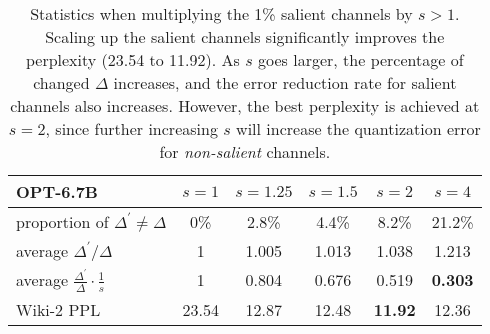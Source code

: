 \begin{table}
    \setlength{\tabcolsep}{2pt}
    \small
    \centering
    \begin{tabular}{lccccc}
        \toprule
     \textbf{OPT-6.7B}   & $s=1$ & $s=1.25$ & $s=1.5$ & $s=2$ & $s=4$ \\ \midrule
    proportion of $\Delta^{'} \neq \Delta$ & 0\% & 2.8\% & 4.4\% & 8.2\% & 21.2\% \\
    average $\Delta^{'}/ \Delta$ & 1 & 1.005 & 1.013 & 1.038 & 1.213 \\
    average $\frac{\Delta^{'}}{\Delta} \cdot \frac{1}{s}$ & 1 & 0.804  & 0.676 & 0.519 & \textbf{0.303} \\ \midrule 
    Wiki-2 PPL & 23.54 & 12.87 & 12.48 & \textbf{11.92} & 12.36 \\
    \bottomrule
    \end{tabular}
    \caption{Statistics when multiplying the 1\% salient channels by $s>1$. Scaling up the salient channels significantly improves the perplexity (23.54 to 11.92). As $s$ goes larger, the percentage of changed $\Delta$ increases, and the error reduction rate for salient channels also increases. However, the best perplexity is achieved at $s=2$, since further increasing $s$ will increase the quantization error for \emph{non-salient} channels. 
    } 
    \label{tab:scale_study}
\end{table}

